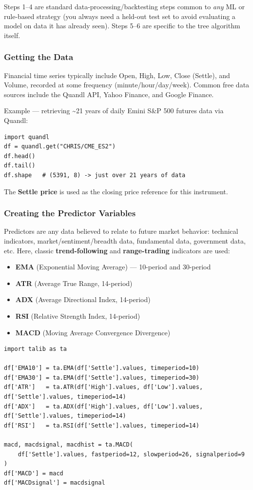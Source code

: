 \documentclass[12pt,openany]{book}
\begin{document}
Steps 1--4 are standard data-processing/backtesting steps common to \textit{any} ML or rule-based strategy (you always need a held-out test set to avoid evaluating a model on data it has already seen). Steps 5--6 are specific to the tree algorithm itself.

\subsubsection{Getting the Data}


Financial time series typically include Open, High, Low, Close (Settle), and Volume, recorded at some frequency (minute/hour/day/week). Common free data sources include the Quandl API, Yahoo Finance, and Google Finance.

Example --- retrieving \textasciitilde{}21 years of daily Emini S\&P 500 futures data via Quandl:

\begin{Verbatim}[breaklines=true,fontsize=\small]
import quandl
df = quandl.get("CHRIS/CME_ES2")
df.head()
df.tail()
df.shape   # (5391, 8) -> just over 21 years of data
\end{Verbatim}


The \textbf{Settle price} is used as the closing price reference for this instrument.

\subsubsection{Creating the Predictor Variables}


Predictors are any data believed to relate to future market behavior: technical indicators, market/sentiment/breadth data, fundamental data, government data, etc. Here, classic \textbf{trend-following} and \textbf{range-trading} indicators are used:

\begin{itemize}[leftmargin=*]
    \item \textbf{EMA} (Exponential Moving Average) --- 10-period and 30-period
    \item \textbf{ATR} (Average True Range, 14-period)
    \item \textbf{ADX} (Average Directional Index, 14-period)
    \item \textbf{RSI} (Relative Strength Index, 14-period)
    \item \textbf{MACD} (Moving Average Convergence Divergence)
\end{itemize}


\begin{Verbatim}[breaklines=true,fontsize=\small]
import talib as ta

df['EMA10'] = ta.EMA(df['Settle'].values, timeperiod=10)
df['EMA30'] = ta.EMA(df['Settle'].values, timeperiod=30)
df['ATR']   = ta.ATR(df['High'].values, df['Low'].values, df['Settle'].values, timeperiod=14)
df['ADX']   = ta.ADX(df['High'].values, df['Low'].values, df['Settle'].values, timeperiod=14)
df['RSI']   = ta.RSI(df['Settle'].values, timeperiod=14)

macd, macdsignal, macdhist = ta.MACD(
    df['Settle'].values, fastperiod=12, slowperiod=26, signalperiod=9
)
df['MACD'] = macd
df['MACDsignal'] = macdsignal
\end{Verbatim}
\end{document}
